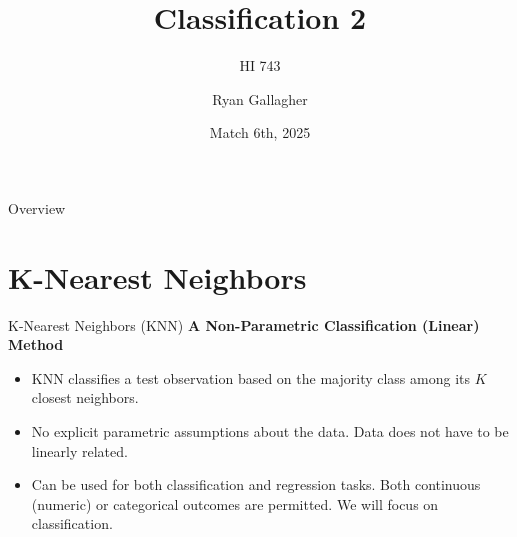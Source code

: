 \documentclass[aspectratio=169,xcolor=dvipsnames]{beamer}
\title{Classification 2}
\subtitle{HI 743}
\author{Ryan Gallagher}
\institute
{
    Department of Health Informatics and Administration \\
    Zilber College of Public Health \\
    University of Wisconsin - Milwaukee%
}
\date{Match 6th, 2025} %
\begin{document}
\begin{frame}
    \titlepage
\end{frame}


\begin{frame}{Overview}
    \tableofcontents
\end{frame}

\section{K-Nearest Neighbors}
\begin{frame}{K-Nearest Neighbors (KNN)}
    \textbf{A Non-Parametric Classification (Linear) Method}
    \begin{itemize}
    \setlength\itemsep{0.5cm}
        \item KNN classifies a test observation based on the majority class among its \( K \) closest neighbors.
        \item No explicit parametric assumptions about the data. Data does not have to be linearly related.
        \item Can be used for both classification and regression tasks. Both continuous (numeric) or categorical outcomes are permitted. We will focus on classification.
    \end{itemize}
\end{frame}

\end{document}
